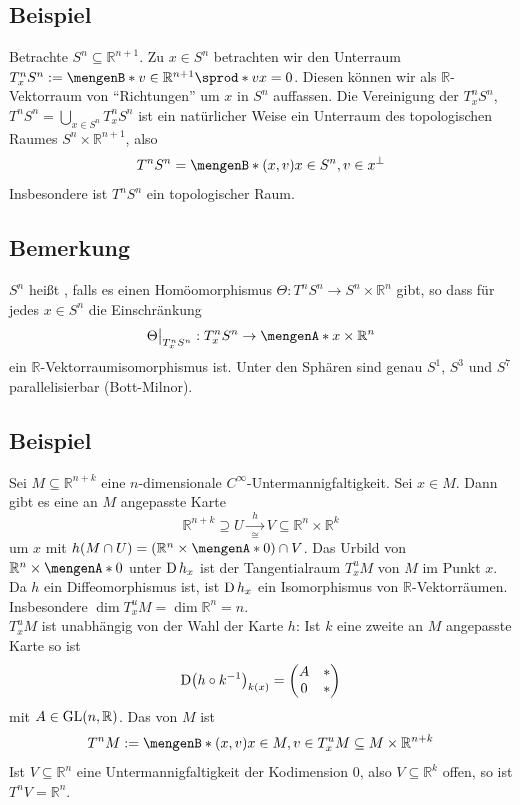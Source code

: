 \subsection[Beispiel: Tangentialraum des $S^n$]{Beispiel} %
\label{sub:181}
Betrachte $S^n \subseteq \mathds{R}^{n+1}$. Zu $x \in S^n$ betrachten wir den Unterraum $T_x^n S^n := \set[v \in \mathds{R}^{n+1}]{\sprod*{v}{x}=0}$. Diesen können wir als
$\mathds{R}$-Vektorraum von \enquote{Richtungen} um $x$ in $S^n$ auffassen. Die Vereinigung der $T^n_x S^n$, $T^n S^n = \bigcup_{x \in S^n}T_x^n S^n$ ist ein natürlicher 
Weise ein Unterraum des topologischen Raumes $S^n \times \mathds{R}^{n+1}$, also
\[
	T^nS^n = \set[(x,v)]{x \in S^n, v \in x^\bot} 
\]
Insbesondere ist $T^n S^n$ ein topologischer Raum.

\subsection[Bemerkung: Parallelisierbar]{Bemerkung} %
\label{sub:182}
$S^n$ heißt , falls es einen Homöomorphismus  $\Theta : T^n S^n\to S^n\times \mathds{R}^n$ gibt, so dass für jedes $x \in S^n$ die Einschränkung 
\[
	\Theta\big|_{T_x^n S^n} : T^n_x S^n \to \set{x}\times \mathds{R}^n 
\]
ein $\mathds{R}$-Vektorraumisomorphismus ist. Unter den Sphären sind genau $S^1$, $S^3$ und $S^7$
parallelisierbar (Bott-Milnor).

\subsection[Beispiel: Tangentialraum von Untermannigfaltigkeiten des $\mathds{R}^{n+k}$]{Beispiel} %
\label{sub:183}
Sei $M \subseteq \mathds{R}^{n+k}$ eine $n$-dimensionale $C^\infty$-Untermannigfaltigkeit. Sei $x \in M$. Dann gibt es eine an $M$ angepasste Karte 
\[
	\mathds{R}^{n+k} \supseteq U \xrightarrow[\cong]{\enspace h \enspace} V \subseteq \mathds{R}^n \times \mathds{R}^k 
\]
um $x$ mit $h(M \cap U) =(\mathds{R}^n \times \set{0})\cap V$. Das Urbild von $\mathds{R}^n \times \set{0}$ unter $\operatorname{D} h_x$ ist der Tangentialraum $T^u_x M$ von $M$ im Punkt
$x$. Da $h$ ein Diffeomorphismus ist, ist $\operatorname{D} h_x$ ein Isomorphismus von $\mathds{R}$-Vektorräumen. Insbesondere $\dim T^u_x M = \dim \mathds{R}^n = n$.\\
$T_x^u M$ ist unabhängig von der Wahl der Karte $h$: Ist $k$ eine zweite an $M$ angepasste Karte so ist 
\[
	\D \enbrace*{h \circ k ^{-1}}_{k(x)} = \begin{pmatrix}
		A & * \\
		0 & *
	\end{pmatrix}
\]
mit $A \in \operatorname{GL}(n,\mathbb{R})$. Das  von $M$ ist 
\[
	T^n M := \set[(x,v)]{x \in M, v \in T_x^u M} \subseteq M \times \mathds{R}^{n+k} 
\]
Ist $V \subseteq \mathds{R}^n$ eine Untermannigfaltigkeit der Kodimension $0$, also $V \subseteq \mathds{R}^k$ offen, so ist $T^n V = \mathds{R}^n$.

